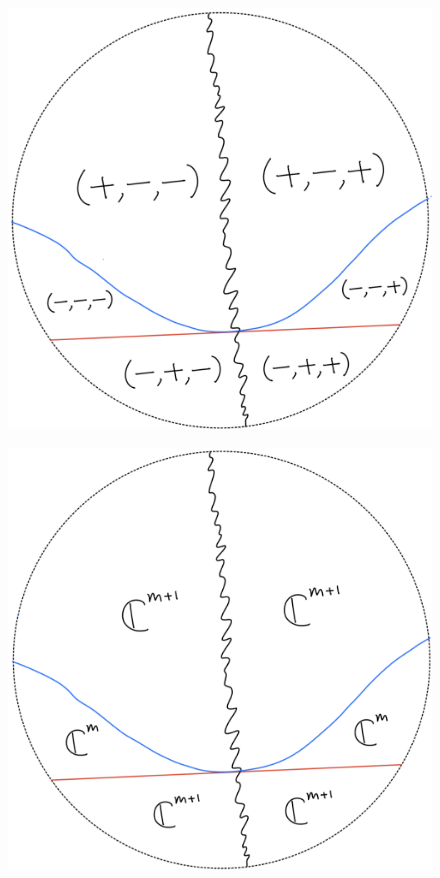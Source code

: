 \begin{figure}[H]
    \centering
    \includegraphics[scale = 0.95]{diagrams/lemma1/24.png} 
    \caption{}
    \label{fig:your-label}
\end{figure}
\begin{figure}[H]
    \centering
    \includegraphics[scale = 0.95]{diagrams/lemma1/25.png} 
    \caption{}
    \label{fig:your-label}
\end{figure}
